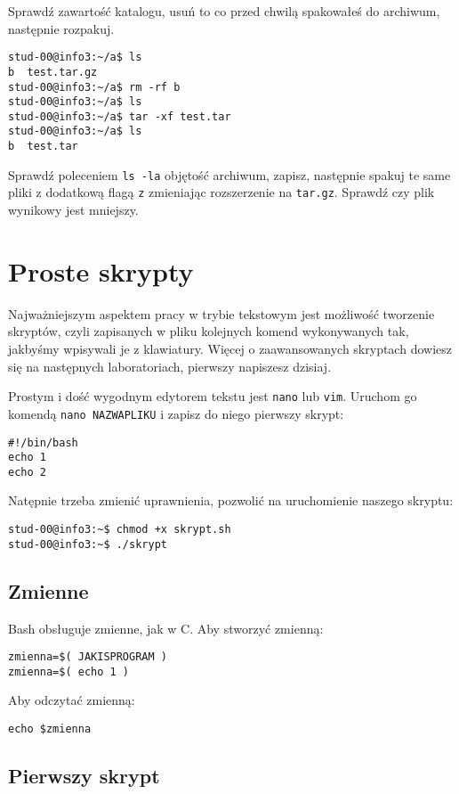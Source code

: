 \documentclass{instrukcja}
\begin{document}
Sprawdź zawartość katalogu, usuń to co przed chwilą spakowałeś do archiwum, następnie rozpakuj.

\begin{verbatim}
stud-00@info3:~/a$ ls
b  test.tar.gz
stud-00@info3:~/a$ rm -rf b
stud-00@info3:~/a$ ls
stud-00@info3:~/a$ tar -xf test.tar
stud-00@info3:~/a$ ls
b  test.tar
\end{verbatim}

Sprawdź poleceniem {\tt ls -la} objętość archiwum, zapisz, następnie spakuj te same pliki z dodatkową flagą {\tt z} zmieniając rozszerzenie na {\tt tar.gz}. Sprawdź czy plik wynikowy jest mniejszy.


\section{Proste skrypty}
Najważniejszym aspektem pracy w trybie tekstowym jest możliwość tworzenie skryptów, czyli zapisanych w pliku kolejnych komend wykonywanych tak, jakbyśmy wpisywali je z klawiatury. Więcej o zaawansowanych skryptach dowiesz się na następnych laboratoriach, pierwszy napiszesz dzisiaj.

Prostym i dość wygodnym edytorem tekstu jest {\tt nano} lub {\tt vim}. Uruchom go komendą {\tt nano NAZWAPLIKU} i zapisz do niego pierwszy skrypt:
\begin{verbatim}
#!/bin/bash
echo 1
echo 2
\end{verbatim}

Natępnie trzeba zmienić uprawnienia, pozwolić na uruchomienie naszego skryptu: 
\begin{verbatim}
stud-00@info3:~$ chmod +x skrypt.sh
stud-00@info3:~$ ./skrypt
\end{verbatim}

\subsection{Zmienne}
Bash obsługuje zmienne, jak w C. Aby stworzyć zmienną:
\begin{verbatim}
zmienna=$( JAKISPROGRAM )
zmienna=$( echo 1 )
\end{verbatim}

Aby odczytać zmienną:
\begin{verbatim}
echo $zmienna
\end{verbatim}

\subsection{Pierwszy skrypt}
\end{document}
